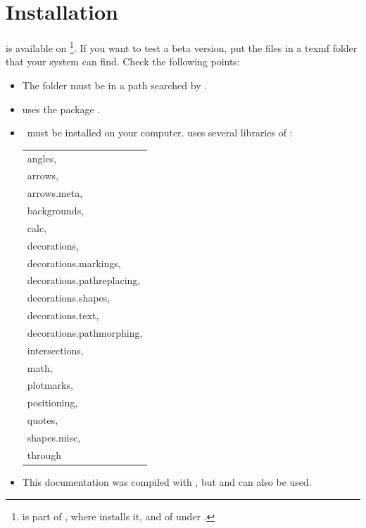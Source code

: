 \section{Installation}

\tkzname{\tkznameofpack} is available on \footnote{\tkzname{\tkznameofpack} is part of , where  installs it, and of  under .}. If you want to test a beta version, put the files in a texmf folder that your system can find.
Check the following points:

\begin{itemize}\setlength{\itemsep}{5pt}
\item The \tkzname{\tkznameofpack} folder must be in a path searched by .
\item \tkzname{\tkznameofpack} uses the package .
\item \PGF\ must be installed on your computer. \tkzname{\tkznameofpack} uses several libraries of \TIKZ:

 \begin{tabular}{l}
    angles,                         \\
    arrows,                         \\
    arrows.meta,                    \\
    backgrounds,                    \\
    calc,                           \\
    decorations,                    \\
    decorations.markings,           \\
    decorations.pathreplacing,      \\
    decorations.shapes,             \\
    decorations.text,               \\
    decorations.pathmorphing,       \\
    intersections,                  \\
    math,                           \\
    plotmarks,                      \\
    positioning,                    \\
    quotes,                         \\
    shapes.misc,                    \\
    through
\end{tabular}

\item This documentation was compiled with , but  and  can also be used.
\end{itemize}

\endinput